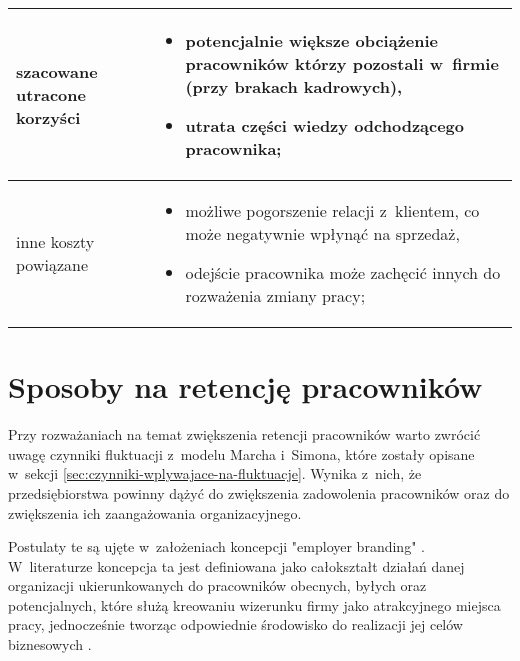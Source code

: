 \begin{minipage}{\textwidth}
\begin{table}[H]
\begin{center}
\begin{tabular}{|P{.15\textwidth}|P{.75\textwidth}|}
                         szacowane utracone korzyści &
                         \begin{itemize}
                             \item potencjalnie większe obciążenie pracowników którzy pozostali w~firmie (przy brakach kadrowych),
                             \item utrata części wiedzy odchodzącego pracownika;
                         \end{itemize} \\
                         \hline

                         inne koszty powiązane &
                         \begin{itemize}
                             \item możliwe pogorszenie relacji z~klientem, co może negatywnie wpłynąć na sprzedaż,
                             \item odejście pracownika może zachęcić innych do rozważenia zmiany pracy;
                         \end{itemize} \\
                         \hline
                     \end{tabular}
                 \end{center}
                 \raggedright{}
                 \vspace{0.75cm}
             \end{table}
\end{minipage}


\section{Sposoby na retencję pracowników}\label{sec:retencja}

Przy rozważaniach na temat zwiększenia retencji pracowników warto zwrócić uwagę czynniki fluktuacji z~modelu Marcha i~Simona,
które zostały opisane w~sekcji \ref{sec:czynniki-wplywajace-na-fluktuacje}.
Wynika z~nich, że przedsiębiorstwa powinny dążyć do zwiększenia zadowolenia pracowników oraz do zwiększenia ich zaangażowania organizacyjnego.

Postulaty te są ujęte w~założeniach koncepcji "employer branding" \cite{spychala-2019}.
W~literaturze koncepcja ta jest definiowana jako
całokształt działań danej organizacji ukierunkowanych do pracowników obecnych, byłych oraz potencjalnych,
które służą kreowaniu wizerunku firmy jako atrakcyjnego miejsca pracy,
jednocześnie tworząc odpowiednie środowisko do realizacji jej celów biznesowych \cite{kozlowski-2012}.

